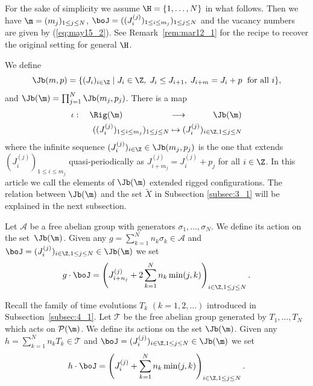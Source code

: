 For the sake of simplicity we assume $\H=\{1,\ldots,N\}$ in what follows.
Then we have $\m = (m_j)_{1 \leq j \leq N}$, $\boJ=((J^{(j)}_i)_{1 \le i \le m_{j}})_{1 \leq j \leq N}$
and the vacancy numbers are given by (\ref{eq:may15_2}).
See Remark~\ref{rem:mar12_1} for the recipe to recover the original setting for general $\H$.

We def\/ine
\begin{equation}
{\Jb} (m,p) = \{(J_i)_{i \in \Z} \mid
J_i \in \Z, \; J_i \le J_{i+1}, \; J_{i+m} = J_i + p\;
\hbox{ for all } i \},\label{eq:jcomp}
\end{equation}
and $\Jb (\m) = \prod_{j=1}^N {\Jb} (m_j,p_j)$.
There is a map
\begin{equation}\label{eq:iota}
\begin{split}
\iota : \quad
\Rig(\m) \qquad \quad\;\;
\qquad&\longrightarrow \qquad\quad
\Jb(\m)\\
((J^{(j)}_i)_{1 \le i \le m_{j}})_{1 \leq j \leq N}
&\mapsto
{(J^{(j)}_i)_{i \in \Z, 1 \leq j \leq N}}
\end{split}
\end{equation}
where the inf\/inite sequence $({J}^{(j)}_i)_{i \in \Z} \in {\Jb} (m_j,p_j)$
is the one that extends
$(J^{(j)}_i)_{1 \le i \le m_j}$ quasi-periodically as
${J}^{(j)}_{i+m_j}={J}^{(j)}_i+p_j$ for all $i \in \Z$.
{In this article we call the elements of $\Jb (\m)$ extended rigged conf\/igurations}.
{The relation between $\Jb (\m)$ and the set $\tilde{X}$ in Subsection \ref{subsec:3_1} will be explained in the next subsection.}

Let ${\mathcal A}$ be a free abelian group with generators $\sigma_1,\ldots,\sigma_N$.
We def\/ine its action
on the set~$\Jb (\m)$.
Given any $g = \sum_{k=1}^N n_k \sigma_k \in {\mathcal A}$ and
$\boJ = (J_i^{(j)})_{i \in \Z, 1 \leq j \leq N} \in \Jb (\m)$
we set
\begin{displaymath}
g \cdot \boJ = \left( J_{i+n_j}^{(j)} + 2 \sum_{k=1}^N n_k \min (j,k) \right)_{i \in \Z, 1 \leq j \leq N}.
\end{displaymath}


Recall the family of time evolutions $T_k$ $(k=1,2,\ldots)$ introduced in Subsection~\ref{subsec:4_1}.
Let ${\mathcal T}$ be the free abelian group generated by $T_1,\ldots,T_N$ which
acts on ${\mathcal P}(\m)$.
We def\/ine its actions on the set $\Jb (\m)$.
Given any $h = \sum_{k=1}^N n_k T_k \in {\mathcal T}$
and $\boJ = (J^{(j)}_i)_{i \in \Z, 1 \leq j \leq N} \in \Jb (\m)$
we set
\begin{displaymath}
h \cdot \boJ = \left( J_{i}^{(j)} + \sum_{k=1}^N n_k \min (j,k) \right)_{i \in \Z, 1 \leq j \leq N}.
\end{displaymath}


